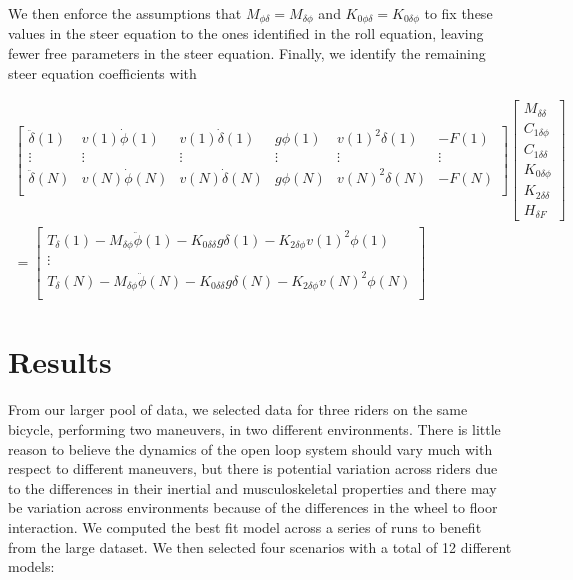 \documentclass[a4paper]{article}
\begin{document}
We then enforce the assumptions that $M_{\phi\delta} = M_{\delta\phi}$ and
$K_{0\phi\delta} = K_{0\delta\phi}$ to fix these values in the steer equation
to the ones identified in the roll equation, leaving fewer free parameters in
the steer equation. Finally, we identify the remaining steer equation
coefficients with

\begin{align}
  \begin{bmatrix}
    \ddot{\delta}(1) &
    v(1) \dot{\phi}(1) &
    v(1) \dot{\delta}(1) &
    g \phi(1) &
    v(1)^2 \delta(1) &
    - F(1)\\
    \vdots & \vdots & \vdots & \vdots & \vdots & \vdots \\
    \ddot{\delta}(N) &
    v(N) \dot{\phi}(N) &
    v(N) \dot{\delta}(N) &
    g \phi(N) &
    v(N)^2 \delta(N) &
    - F(N)\\
  \end{bmatrix}
  \begin{bmatrix}
    M_{\delta\delta} \\
    C_{1\delta\phi} \\
    C_{1\delta\delta} \\
    K_{0\delta\phi} \\
    K_{2\delta\delta} \\
    H_{\delta F}
  \end{bmatrix} \nonumber \\
  =
  \begin{bmatrix}
    T_\delta(1)
    - M_{\delta\phi} \ddot{\phi}(1)
    - K_{0\delta\delta} g \delta(1)
    - K_{2\delta\phi} v(1)^2 \phi(1) \\
    \vdots\\
    T_\delta(N)
    - M_{\delta\phi} \ddot{\phi}(N)
    - K_{0\delta\delta} g \delta(N)
    - K_{2\delta\phi} v(N)^2 \phi(N) \\
  \end{bmatrix}
\end{align}

\section{Results}

From our larger pool of data, we selected data for three riders on the same
bicycle, performing two maneuvers, in two different environments. There is
little reason to believe the dynamics of the open loop system should vary much
with respect to different maneuvers, but there is potential variation across
riders due to the differences in their inertial and musculoskeletal properties
and there may be variation across environments because of the differences in
the wheel to floor interaction. We computed the best fit model across a series
of runs to benefit from the large dataset. We then selected four scenarios with
a total of 12 different models:
\end{document}
